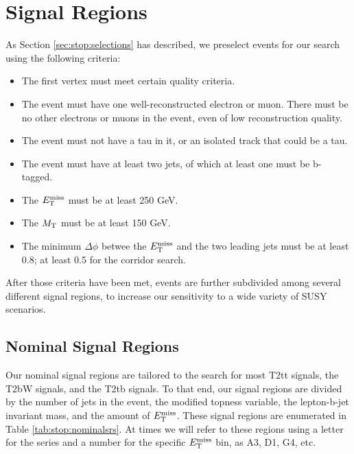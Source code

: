 \section{Signal Regions}
\label{sec:stop:sigregs}

As Section \ref{sec:stop:selections} has described, we preselect events
for our search using the following criteria:
\begin{itemize}
\item The first vertex must meet certain quality criteria.
\item The event must have one well-reconstructed electron or
  muon. There must be no other electrons or muons in the event, even
  of low reconstruction quality.
\item The event must not have a tau in it, or an isolated track that
  could be a tau.
\item The event must have at least two jets, of which at least one
  must be b-tagged.
\item The $E_\text{T}^\text{miss}$ must be at least 250 GeV.
\item The $M_\text{T}$ must be at least 150 GeV.
\item The minimum $\Delta \phi$ betwee the $E_\text{T}^\text{miss}$ and the two leading
  jets must be at least 0.8; at least 0.5 for the corridor search.
\end{itemize}
After those criteria have been met, events are further subdivided
among several different signal regions, to increase our sensitivity to
a wide variety of SUSY scenarios.

\subsection{Nominal Signal Regions}
\label{ssec:stop:sigregsnominal}

Our nominal signal regions are tailored to the search for most T2tt
signals, the T2bW signals, and the T2tb signals. To that end, our
signal regions are divided by the number of jets in the event, the
modified topness variable, the lepton-b-jet invariant mass, and the
amount of $E_\text{T}^\text{miss}$. These signal regions are enumerated in Table
\ref{tab:stop:nominalsrs}. At times we will refer to these regions using a
letter for the series and a number for the specific $E_\text{T}^\text{miss}$ bin, as
A3, D1, G4, etc.

